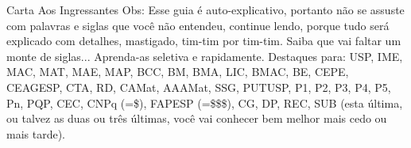 \begin{secao}{Carta Aos Ingressantes}
Obs: Esse guia é auto-explicativo, portanto não se assuste com palavras e siglas
que você não entendeu, continue lendo, porque tudo será explicado com detalhes,
mastigado, tim-tim por tim-tim. Saiba que vai faltar um monte de siglas...
Aprenda-as seletiva e rapidamente. Destaques para: USP, IME, MAC, MAT, MAE, MAP,
BCC, BM, BMA, LIC, BMAC, BE, CEPE, CEAGESP, CTA, RD, CAMat, AAAMat, SSG, PUTUSP,
P1, P2, P3, P4, P5, Pn, PQP, CEC, CNPq (=\$), FAPESP (=\$\$\$), CG, DP, REC, SUB
(esta última, ou talvez as duas ou três últimas, você vai conhecer bem melhor
mais cedo ou mais tarde).

\end{secao}
